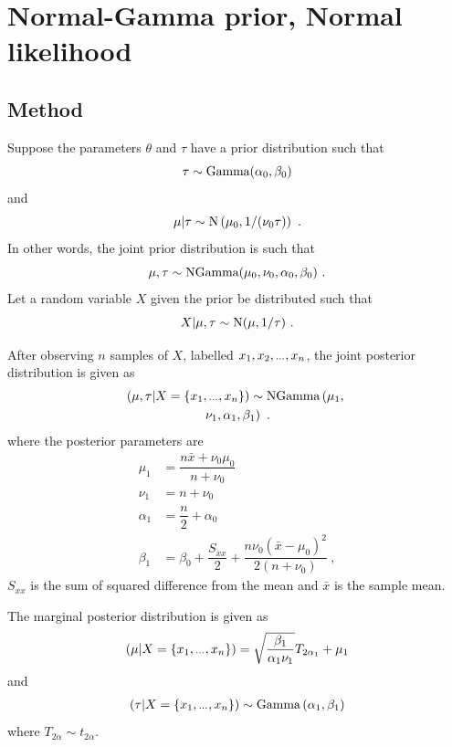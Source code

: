 \documentclass[a4paper]{proc}
\newcommand{\dotdotdot}{\vphantom{.}_{\cdots}}
\begin{document}
\section{Normal-Gamma prior, Normal likelihood}

\subsection{Method}
Suppose the parameters $\theta$ and $\tau$ have a prior distribution such that
\begin{equation}
\tau\sim\textup{Gamma}(\alpha_0,\beta_0)
\end{equation}
and
\begin{equation}
\mu|\tau\sim\textup{N}\left(\mu_0,1/(\nu_0\tau)\right) \ .
\end{equation}
In other words, the joint prior distribution is such that
\begin{equation}
\mu,\tau\sim\textup{NGamma}(\mu_0,\nu_0,\alpha_0,\beta_0) \ .
\end{equation}
Let a random variable $X$ given the prior be distributed such that
\begin{equation}
X|\mu,\tau\sim\textup{N}(\mu,1/\tau) \ .
\end{equation}

After observing $n$ samples of $X$, labelled $x_1,x_2,\dotdotdot ,x_n$, the joint posterior distribution is given as
\begin{multline}
(\mu,\tau|X=\{x_1,\dotdotdot ,x_n\})\sim\textup{NGamma}
\left(
	\mu_1,
	\right.\\\left.
	\nu_1,
	\alpha_1,
	\beta_1
\right) \ .
\end{multline}
where the posterior parameters are
\begin{align}
\mu_1 &= \dfrac{n\bar{x}+\nu_0\mu_0}{n+\nu_0} \\
\nu_1 &= n+\nu_0 \\
\alpha_1 &= \dfrac{n}{2}+\alpha_0 \\
\beta_1 &= \beta_0+\dfrac{S_{xx}}{2}+\dfrac{n\nu_0(\bar{x}-\mu_0)^2}{2(n+\nu_0)} \ ,
\end{align}
$S_{xx}$ is the sum of squared difference from the mean and $\bar{x}$ is the sample mean.

The marginal posterior distribution is given as
\begin{equation}
(\mu|X=\{x_1,\dotdotdot ,x_n\}) = \sqrt{\dfrac{\beta_1}{\alpha_1\nu_1}} T_{2\alpha_1}
+ \mu_1
\end{equation}
and
\begin{multline}
(\tau|X=\{x_1,\dotdotdot ,x_n\}) \sim \textup{Gamma}\left(
\alpha_1,\beta_1
\right)
\end{multline}
where $T_{2\alpha}\sim t_{2\alpha}$.
\end{document}
